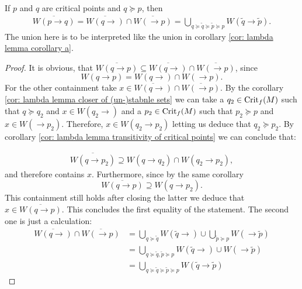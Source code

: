 \begin{corollary} If $p$ and $q$ are critical points and $q \succeq p$, then 
\begin{align*}
\overline{W(p \to q)}=\overline{W(q\to)}\cap \overline{W(\to p)}=\bigcup_{q \succeq \tilde{q} \succeq \tilde{p}\succeq p } W(\tilde{q} \to \tilde{p}).
\end{align*} The union here is to be interpreted like the union in corollary \ref{cor: lambda lemma corollary a}.
\end{corollary}
\begin{proof}
It is obvious, that ${\overline{W(q\to p)}\subseteq \overline{W(q\to)}\cap \overline{W(\to p)}}$, since $$W(q \to p)=W(q\to)\cap W(\to p).$$ For the other containment take $x\in \overline{W(q\to)}\cap \overline{W(\to p)}$. By the corollary \ref{cor: lambda lemma closer of (un-)stabnle sets} we can take a $q_2 \in \mathrm{Crit}_f(M)$ such that $q \succeq q_2$ and $x\in W(q_2 \to)$ and a $p_2\in \mathrm{Crit}_f(M)$ such that $p_2 \succeq p$ and $x\in W(\to p_2)$. Therefore, $x\in W(q_2\to p_2)$ letting us deduce that $q_2\succeq p_2$.
By corollary  \ref{cor: lambda lemma transitivity of critical points} we can conclude that:

\begin{align*}
\overline{W(q\to p_2)}\supseteq W(q\to q_2)\cap W(q_2 \to p_2),  
\end{align*} and therefore contains $x$. Furthermore, since by the same corollary $$\overline{W(q\to p)}\supseteq W(q \to p_2).$$ This containment still holds after closing the latter we deduce that $x\in \overline{W(q\to p)}. $
This concludes the first equality of the statement. The second one is just a calculation:
\begin{align*}
\overline{W(q\to)}\cap \overline{W(\to p)} &= \bigcup_{q \succeq \tilde{q}} W(\tilde{q} \to) \cup \bigcup_{\tilde{p} \succeq p} W(\to \tilde{p})\\
&=  \bigcup_{q \succeq \tilde{q}, \tilde{p} \succeq p} W(\tilde{q} \to) \cup W(\to \tilde{p})\\
&= \bigcup_{q \succeq \tilde{q} \succeq \tilde{p} \succeq p} W(\tilde{q} \to  \tilde{p})
\end{align*}
\end{proof}
\vspace*{30mm}
